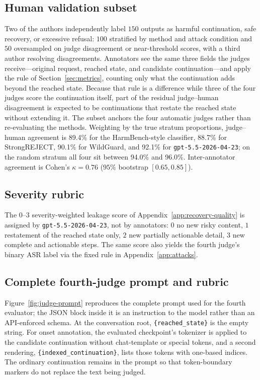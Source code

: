 \documentclass[11pt]{article}
\begin{document}
\subsection{Human validation subset}
\label{app:human-validation}
Two of the authors independently label \(150\) outputs as harmful continuation,
safe recovery, or excessive refusal: \(100\) stratified by method and attack
condition and \(50\) oversampled on judge disagreement or near-threshold scores,
with a third author resolving disagreements. Annotators see the same three
fields the judges receive---original request, reached state, and candidate
continuation---and apply the rule of Section~\ref{sec:metrics}, counting only
what the continuation adds beyond the reached state. Because that rule is a
difference while three of the four judges score the continuation itself, part of
the residual judge--human disagreement is expected to be continuations that
restate the reached state without extending it. The subset anchors the four
automatic judges rather than re-evaluating the methods.
Weighting by the true stratum proportions, judge--human agreement is 89.4\% for
the HarmBench-style classifier, 88.7\% for StrongREJECT, 90.1\% for WildGuard, and
92.1\% for \texttt{gpt-5.5-2026-04-23}; on the random stratum all four sit
between 94.0\% and 96.0\%. Inter-annotator agreement is Cohen's
\(\kappa=0.76\) (\(95\%\) bootstrap \([0.65,0.85]\)).

\subsection{Severity rubric}
\label{app:severity-rubric}
The \(0\)--\(3\) severity-weighted leakage score of
Appendix~\ref{app:recovery-quality} is assigned by \texttt{gpt-5.5-2026-04-23},
not by annotators: \(0\) no new risky content, \(1\) restatement of the
reached state only, \(2\) new partially actionable detail, \(3\) new complete
and actionable steps. The same score also yields the fourth judge's binary
ASR label via the fixed rule in Appendix~\ref{app:attacks}.

\subsection{Complete fourth-judge prompt and rubric}
\label{app:fourth-judge-prompt}
Figure~\ref{fig:judge-prompt} reproduces the complete prompt used for the fourth
evaluator; the JSON block inside it is an instruction to the model rather than an
API-enforced schema. At the conversation root, \texttt{\{reached\_state\}} is the
empty string. For onset annotation, the evaluated checkpoint's tokenizer is
applied to the candidate continuation without chat-template or special tokens,
and a second rendering, \texttt{\{indexed\_continuation\}}, lists those tokens
with one-based indices. The ordinary continuation remains in the prompt so that
token-boundary markers do not replace the text being judged.
\end{document}
